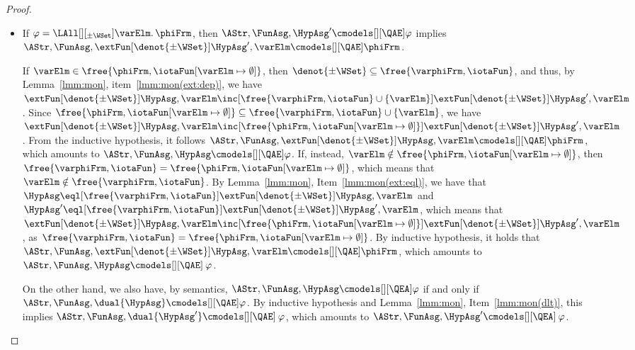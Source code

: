 \documentclass[authoryear]{elsarticle}
\begin{document}
\begin{proof}
\begin{itemize}
  \item If $\varphi = \LAll[][_{\pm\WSet}] \varElm \ldotp \phiFrm$, then
    $\AStr, \FunAsg, \HypAsg' \cmodels[][\QAE] \varphi$ implies $\AStr, \FunAsg,
    \extFun[\denot{\pm\WSet}]{\HypAsg', \varElm} \cmodels[][\QAE] \phiFrm$.

    If $\varElm \in \free{\phiFrm,{\iotaFun}[\varElm \mapsto
      \emptyset]}$, then $\denot{\pm\WSet} \subseteq
    \free{\varphiFrm,\iotaFun}$, and thus, by Lemma~\ref{lmm:mon},
    item~\ref{lmm:mon(ext:dep)}, we have $\extFun[\denot{\pm\WSet}]{\HypAsg,
      \varElm} \inc[\free{\varphiFrm,\iotaFun} \cup \{ \varElm \}]
    \extFun[\denot{\pm\WSet}]{\HypAsg', \varElm}$.
    Since $\free{\phiFrm, {\iotaFun}[\varElm \mapsto \emptyset]} \subseteq
    \free{\varphiFrm, \iotaFun} \cup \{ \varElm \}$, we have
    $\extFun[\denot{\pm\WSet}]{\HypAsg, \varElm} \inc[\free{\phiFrm,
      {\iotaFun}[\varElm \mapsto \emptyset]}]
    \extFun[\denot{\pm\WSet}]{\HypAsg', \varElm}$.
    From the inductive hypothesis, it follows $\AStr, \FunAsg,
    \extFun[\denot{\pm\WSet}]{\HypAsg, \varElm} \cmodels[][\QAE] \phiFrm$,
    which amounts to $\AStr, \FunAsg, \HypAsg \cmodels[][\QAE] \varphi$.
    If, instead, $\varElm \notin \free{\phiFrm,{\iotaFun}[\varElm \mapsto
      \emptyset]}$, then $\free{\varphiFrm,\iotaFun} =
    \free{\phiFrm,{\iotaFun}[\varElm \mapsto \emptyset]}$, which means that
    $\varElm \notin \free{\varphiFrm,\iotaFun}$.
    By Lemma~\ref{lmm:mon}, Item~\ref{lmm:mon(ext:eql)}, we have that $\HypAsg
    \eql[\free{\varphiFrm,\iotaFun}] \extFun[\denot{\pm\WSet}]{\HypAsg,
      \varElm}$ and $\HypAsg' \eql[\free{\varphiFrm,\iotaFun}]
    \extFun[\denot{\pm\WSet}]{\HypAsg', \varElm}$, which means that
    $\extFun[\denot{\pm\WSet}]{\HypAsg, \varElm} \inc[\free{\phiFrm,
      {\iotaFun}[\varElm \mapsto \emptyset]}]
    \extFun[\denot{\pm\WSet}]{\HypAsg', \varElm}$, as
    $\free{\varphiFrm,\iotaFun} = \free{\phiFrm,{\iotaFun}[\varElm \mapsto
      \emptyset]}$.
    By inductive hypothesis, it holds that $\AStr, \FunAsg,
    \extFun[\denot{\pm\WSet}]{\HypAsg, \varElm} \cmodels[][\QAE] \phiFrm$,
    which amounts to $\AStr, \FunAsg, \HypAsg \cmodels[][\QAE]\: \varphi$.

    On the other hand, we also have, by semantics, $\AStr, \FunAsg, \HypAsg
    \cmodels[][\QEA] \varphi$ if and only if $\AStr, \FunAsg, \dual{\HypAsg}
    \cmodels[][\QAE] \varphi$.
    By inductive hypothesis and Lemma~\ref{lmm:mon}, Item~\ref{lmm:mon(dlt)},
    this implies $\AStr, \FunAsg, \dual{\HypAsg'} \cmodels[][\QAE]\: \varphi$,
    which amounts to $\AStr, \FunAsg, \HypAsg' \cmodels[][\QEA]\:
    \varphi$.


\end{itemize}
\end{proof}
\end{document}
